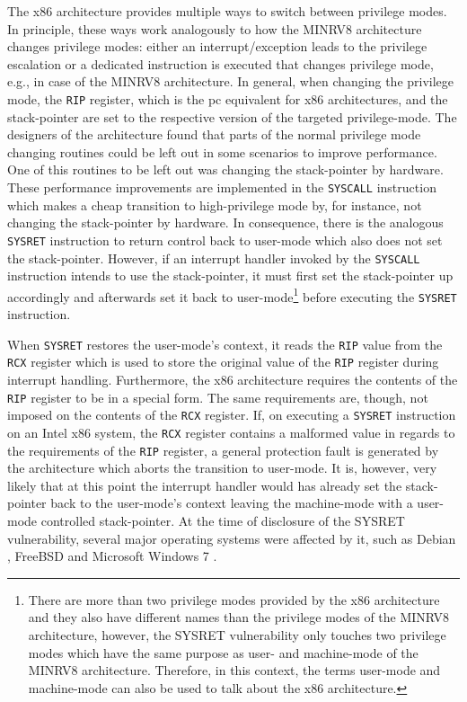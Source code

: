 The x86 architecture provides multiple ways to switch between privilege modes.
In principle, these ways work analogously to how the MINRV8 architecture changes privilege modes: either an interrupt/exception leads to the privilege escalation or a dedicated instruction is executed that changes privilege mode, e.g.,  in case of the MINRV8 architecture.
In general, when changing the privilege mode, the \lstinline{RIP} register, which is the \gls{pc} equivalent for x86 architectures, and the stack-pointer are set to the respective version of the targeted privilege-mode.
The designers of the architecture found that parts of the normal privilege mode changing routines could be left out in some scenarios to improve performance.
One of this routines to be left out was changing the stack-pointer by hardware.
These performance improvements are implemented in the \lstinline{SYSCALL} instruction which makes a cheap transition to high-privilege mode by, for instance, not changing the stack-pointer by hardware.
In consequence, there is the analogous \lstinline{SYSRET} instruction to return control back to user-mode which also does not set the stack-pointer.
However, if an interrupt handler invoked by the \lstinline{SYSCALL} instruction intends to use the stack-pointer, it must first set the stack-pointer up accordingly and afterwards set it back to user-mode\footnote{%
    There are more than two privilege modes provided by the x86 architecture and they also have different names than the privilege modes of the MINRV8 architecture, however, the SYSRET vulnerability only touches two privilege modes which have the same purpose as user- and machine-mode of the MINRV8 architecture.
    Therefore, in this context, the terms user-mode and machine-mode can also be used to talk about the x86 architecture.
} before executing the \lstinline{SYSRET} instruction.

When \lstinline{SYSRET} restores the user-mode's context, it reads the \lstinline{RIP} value from the \lstinline{RCX} register which is used to store the original value of the \lstinline{RIP} register during interrupt handling.
Furthermore, the x86 architecture requires the contents of the \lstinline{RIP} register to be in a special form.
The same requirements are, though, not imposed on the contents of the \lstinline{RCX} register.
If, on executing a \lstinline{SYSRET} instruction on an Intel x86 system, the \lstinline{RCX} register contains a malformed value in regards to the requirements of the \lstinline{RIP} register, a general protection fault is generated by the architecture which aborts the transition to user-mode.
It is, however, very likely that at this point the interrupt handler would has already set the stack-pointer back to the user-mode's context leaving the machine-mode with a user-mode controlled stack-pointer.
At the time of disclosure of the SYSRET vulnerability, several major operating systems were affected by it, such as Debian \cite{SYSRETDebian}, FreeBSD \cite{SYSRETFreeBSD} and Microsoft Windows 7 \cite{SYSRETMicrosoft}.

